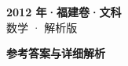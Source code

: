 \documentclass[zihao=-4, a4paper]{ctexart}
\begin{document}
\begin{center}
  {\Large\bfseries 2012 年·福建卷·文科}\\[4pt]
  {\large 数学 · 解析版}
\end{center}
\medskip
{}

\clearpage
{}
\begin{center}{\Large\bfseries 参考答案与详细解析}\end{center}
\medskip

\end{document}
